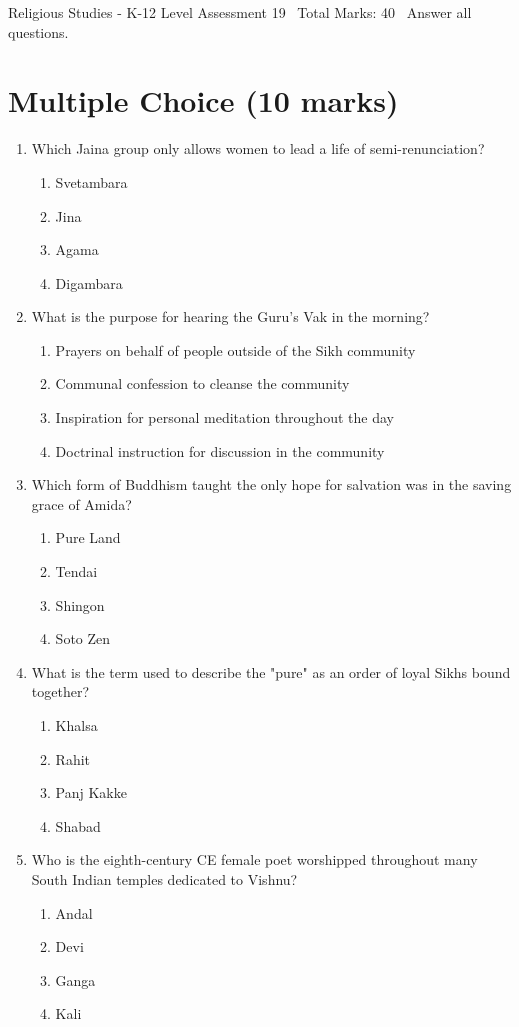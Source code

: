\documentclass[12pt]{article}
\begin{document}
\begin{center}
Religious Studies - K-12 Level Assessment 19 \
Total Marks: 40 \
Answer all questions.
\end{center}

\section*{Multiple Choice (10 marks)}
\begin{enumerate}[label=\arabic*.]
\item Which Jaina group only allows women to lead a life of semi-renunciation?
\begin{enumerate}[label=(\alph*)]
    \item Svetambara
    \item Jina
    \item Agama
    \item Digambara
\end{enumerate}
\item What is the purpose for hearing the Guru's Vak in the morning?
\begin{enumerate}[label=(\alph*)]
    \item Prayers on behalf of people outside of the Sikh community
    \item Communal confession to cleanse the community
    \item Inspiration for personal meditation throughout the day
    \item Doctrinal instruction for discussion in the community
\end{enumerate}
\item Which form of Buddhism taught the only hope for salvation was in the saving grace of Amida?
\begin{enumerate}[label=(\alph*)]
    \item Pure Land
    \item Tendai
    \item Shingon
    \item Soto Zen
\end{enumerate}
\item What is the term used to describe the "pure" as an order of loyal Sikhs bound together?
\begin{enumerate}[label=(\alph*)]
    \item Khalsa
    \item Rahit
    \item Panj Kakke
    \item Shabad
\end{enumerate}
\item Who is the eighth-century CE female poet worshipped throughout many South Indian temples dedicated to Vishnu?
\begin{enumerate}[label=(\alph*)]
    \item Andal
    \item Devi
    \item Ganga
    \item Kali
\end{enumerate}
\end{enumerate}
\end{document}
